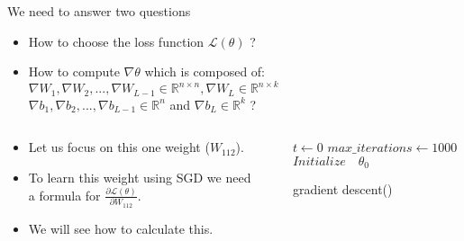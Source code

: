 \savestack{\figuretwo}{}
\savestack{\figurethree}{}

\begin{frame}
\end{frame}

\begin{frame}
  \begin{block}{We need to answer two questions}
    \begin{itemize}
      \justifying
      \item How to choose the loss function $\mathscr{L}(\theta)$ ?
      \item \alert<2->{How to compute $\nabla \theta$ which is composed of:\\
      $\nabla W_1, \nabla W_2, ..., \nabla W_{L-1} \in \mathbb{R}^{n \times n}, \nabla W_{L} \in \mathbb{R}^{n \times k}$\\
      $\nabla b_1, \nabla b_2, ..., \nabla b_{L-1} \in \mathbb{R}^n $ and $\nabla b_{L} \in \mathbb{R}^k$ ?}
    \end{itemize}
  \end{block}
\end{frame}

\begin{frame}
  \begin{columns}
    \begin{overlayarea}{\textwidth}{\textheight}
      \begin{itemize}
        \justifying
        \item<1-> Let us focus on this one weight ($W_{112}$).
        \item<2-> To learn this weight using SGD we need a formula for $\frac{\partial \mathscr{L}(\theta)}{ \partial W_{112}}$.
        \item<3-> We will see how to calculate this.
      \end{itemize}
    \end{overlayarea}


    \begin{overlayarea}{\textwidth}{\textheight}
      \makebox[\textwidth][c]{\usebox{\figuretwocontent}}
    \end{overlayarea}

    \begin{overlayarea}{\textwidth}{\textheight}
      \begin{algorithm}[H]
        \SetAlgoLined
        $t \leftarrow 0$\;
        $max\_iterations\leftarrow 1000$\;
        $Initialize \quad \theta_0$\;
        \color{black}
        \caption{gradient descent()}
      \end{algorithm}
    \end{overlayarea}
  \end{columns}
\end{frame}


